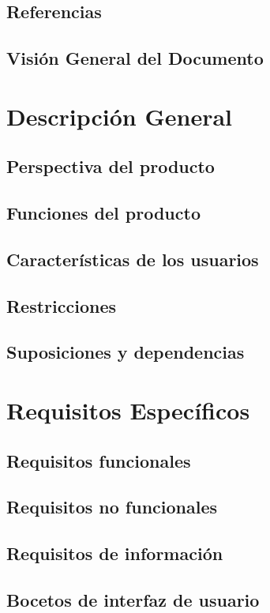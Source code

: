 \subsection{Referencias}
\subsection{Visión General del Documento}


\section{Descripción General}
\subsection{Perspectiva del producto}
\subsection{Funciones del producto}
\subsection{Características de los usuarios}
\subsection{Restricciones}
\subsection{Suposiciones y dependencias}


\section{Requisitos Específicos}
\subsection{Requisitos funcionales}
\subsection{Requisitos no funcionales}
\subsection{Requisitos de información}
\subsection{Bocetos de interfaz de usuario}